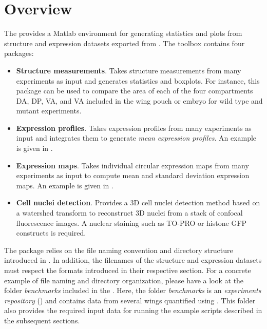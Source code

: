 \section{Overview}
The \wingjMatlab provides a Matlab environment for generating statistics and plots from structure and expression datasets exported from \wingj. The toolbox contains four packages:

\begin{itemize}
 \item \textbf{Structure measurements}. Takes structure measurements from many experiments as input and generates statistics and boxplots. For instance, this package can be used to compare the area of each of the four compartments DA, DP, VA, and VA included in the \droso wing pouch or embryo for wild type and mutant experiments.
 \item \textbf{Expression profiles}. Takes expression profiles from many experiments as input and integrates them to generate \textit{mean expression profiles}. An example is given in .
 \item \textbf{Expression maps}. Takes individual circular expression maps from many experiments as input to compute mean and standard deviation expression maps. An example is given in .
 \item \textbf{Cell nuclei detection}. Provides a 3D cell nuclei detection method based on a watershed transform to reconstruct 3D nuclei from a stack of confocal fluorescence images. A nuclear staining such as TO-PRO \autocite{suzuki1997dna} or histone GFP constructs \autocite{kanda1998histone} is required.
\end{itemize}

The \wingjMatlab package relies on the file naming convention and directory structure introduced in . In addition, the filenames of the structure and expression datasets must respect the formats introduced in their respective section. For a concrete example of file naming and directory organization, please have a look at the folder \emph{benchmarks} included in the \wingjMatlab. Here, the folder \emph{benchmarks} is an \emph{experiments repository} () and contains data from several wings quantified using \wingj. This folder also provides the required input data for running the example \matlab scripts described in the subsequent sections.


